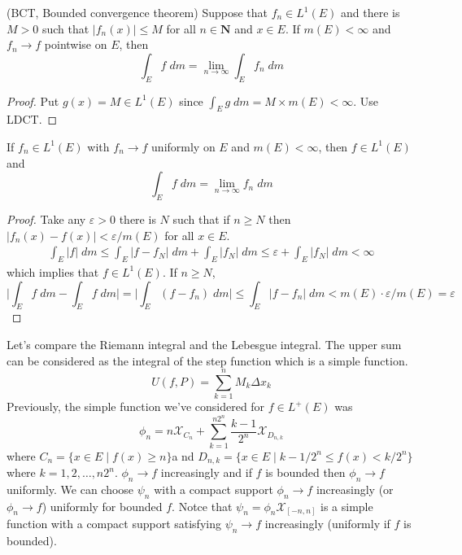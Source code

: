 \begin{cor}
(BCT, Bounded convergence theorem) Suppose that $f_{n}\in L^{1}(E)$ and there is $M>0$ such that $|f_{n}(x)|\leq M$ for all $n\in {\bm N}$ and $x\in E$. If $m(E)<\infty $ and $f_{n}\rightarrow f$ pointwise on $E$, then
\[\int _{E}f\;d m=\lim _{n\rightarrow \infty }\int _{E}f_{n}\;d m\]
\end{cor}
\vspace{2ex}
\begin{proof}
Put $g(x)=M\in L^{1}(E)$ since $\int _{E}g\;d m=M\times m(E)<\infty $. Use LDCT.
\end{proof}
\vspace{2ex}
\begin{thm}
If $f_{n}\in L^{1}(E)$ with $f_{n}\rightarrow f$ uniformly on $E$ and $m(E)<\infty $, then $f\in L^{1}(E)$ and 
\[\int _{E}f\;d m=\lim _{n\rightarrow \infty }f_{n}\;d m\]
\end{thm}
\vspace{2ex}
\begin{proof}
Take any $\varepsilon >0$ there is $N$ such that if $n\geq N$ then $|f_{n}(x)-f(x)|<\varepsilon /m(E)$ for all $x\in E$.
\begin{align*}
\int _{E}|f|\;d m\leq \int _{E}|f-f_{N}|\;d m+\int _{E}|f_{N}|\;d m\leq \varepsilon +\int _{E}|f_{N}|\;d m<\infty 
\end{align*}
which implies that $f\in L^{1}(E)$. If $n\geq N$,
\[\Big|\int _{E}f\;d m-\int _{E}f\;d m\Big|=\Big|\int _{E}(f-f_{n})\;d m\Big|\leq \int _{E}|f-f_{n}|\;d m<m(E)\cdot \varepsilon /m(E)=\varepsilon \]
\end{proof}
\vspace{2ex}
\begin{rmk}
Let's compare the Riemann integral and the Lebesgue integral. The upper sum can be considered as the integral of the step function which is a simple function.
\[U(f,P)=\sum ^{n}_{k=1}M_{k}\Delta x_{k}\]
Previously, the simple function we've considered for $f\in L^{+}(E)$ was
\[\phi _{n}=n\mathcal{X}_{C_{n}}+\sum ^{n2^{n}}_{k=1}\dfrac{k-1}{2^{n}}\mathcal{X}_{D_{n,k}}\]
where $C_{n}=\{x\in E \;|\; f(x)\geq n\}$a nd $D_{n,k}=\{x \in E \;|\; k-1/2^{n}\leq f(x)<k/2^{n}\}$ where $k=1,2,\ldots ,n2^{n}$. $\phi _{n}\rightarrow f$ increasingly and if $f$ is bounded then $\phi _{n}\rightarrow f$ uniformly. We can choose $\psi _{n}$ with a compact support $\phi _{n}\rightarrow f$ increasingly (or $\phi _{n}\rightarrow f$) uniformly for bounded $f$. Notce that $\psi _{n}=\phi _{n}\mathcal{X}_{[-n,n]}$ is a simple function with a compact support satisfying $\psi _{n}\rightarrow f$ increasingly (uniformly if $f$ is bounded). 
\end{rmk}
